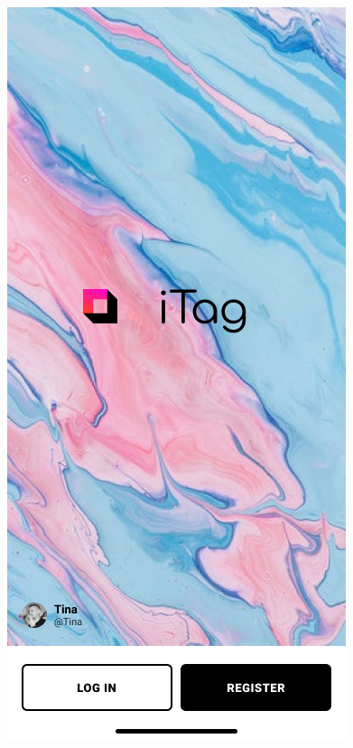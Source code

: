 \documentclass[UTF8]{ctexart}
\begin{document}
\begin{figure}[htbp]
{\begin{minipage}[b]{.3\linewidth}
            \includegraphics[scale=0.3]{Loggedout.png}
        \end{minipage}
    }
\end{figure}
\end{document}
